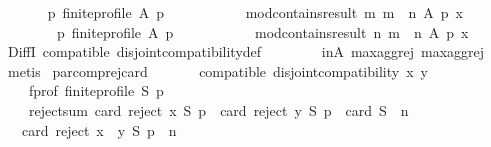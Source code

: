 \begin{isabellebody}
\ \ \isanewline
\ \ \ \ {\isachardoublequoteopen}{\isacharparenleft}{\kern0pt}{\isasymforall}p{\isachardot}{\kern0pt}\ finite{\isacharunderscore}{\kern0pt}profile\ A\ p\ {\isasymlongrightarrow}\isanewline
\ \ \ \ \ \ \ \ \ \ mod{\isacharunderscore}{\kern0pt}contains{\isacharunderscore}{\kern0pt}result\ m\ {\isacharparenleft}{\kern0pt}m\ {\isasymparallel}\isactrlsub {\isasymup}\ n{\isacharparenright}{\kern0pt}\ A\ p\ x{\isacharparenright}{\kern0pt}\ {\isasymor}\isanewline
\ \ \ \ \ \ \ \ {\isacharparenleft}{\kern0pt}{\isasymforall}p{\isachardot}{\kern0pt}\ finite{\isacharunderscore}{\kern0pt}profile\ A\ p\ {\isasymlongrightarrow}\isanewline
\ \ \ \ \ \ \ \ \ \ mod{\isacharunderscore}{\kern0pt}contains{\isacharunderscore}{\kern0pt}result\ n\ {\isacharparenleft}{\kern0pt}m\ {\isasymparallel}\isactrlsub {\isasymup}\ n{\isacharparenright}{\kern0pt}\ A\ p\ x{\isacharparenright}{\kern0pt}{\isachardoublequoteclose}\isanewline
%
\isadelimproof
\ \ %
\endisadelimproof
%
\isatagproof
{}\isamarkupfalse%
\ DiffI\ compatible\ disjoint{\isacharunderscore}{\kern0pt}compatibility{\isacharunderscore}{\kern0pt}def\isanewline
\ \ \ \ \ \ \ \ in{\isacharunderscore}{\kern0pt}A\ max{\isacharunderscore}{\kern0pt}agg{\isacharunderscore}{\kern0pt}rej{}\ max{\isacharunderscore}{\kern0pt}agg{\isacharunderscore}{\kern0pt}rej{}\isanewline
\ \ \isamarkupfalse%
\ metis%
\endisatagproof
{\isafoldproof}%
%
\isadelimproof
\isanewline
%
\endisadelimproof
\isanewline
{}\isamarkupfalse%
\ par{\isacharunderscore}{\kern0pt}comp{\isacharunderscore}{\kern0pt}rej{\isacharunderscore}{\kern0pt}card{\isacharcolon}{\kern0pt}\isanewline
\ \ \isanewline
\ \ \ \ compatible{\isacharcolon}{\kern0pt}\ {\isachardoublequoteopen}disjoint{\isacharunderscore}{\kern0pt}compatibility\ x\ y{\isachardoublequoteclose}\ \isanewline
\ \ \ \ f{\isacharunderscore}{\kern0pt}prof{\isacharcolon}{\kern0pt}\ {\isachardoublequoteopen}finite{\isacharunderscore}{\kern0pt}profile\ S\ p{\isachardoublequoteclose}\ \isanewline
\ \ \ \ reject{\isacharunderscore}{\kern0pt}sum{\isacharcolon}{\kern0pt}\ {\isachardoublequoteopen}card\ {\isacharparenleft}{\kern0pt}reject\ x\ S\ p{\isacharparenright}{\kern0pt}\ {\isacharplus}{\kern0pt}\ card\ {\isacharparenleft}{\kern0pt}reject\ y\ S\ p{\isacharparenright}{\kern0pt}\ {\isacharequal}{\kern0pt}\ card\ S\ {\isacharplus}{\kern0pt}\ n{\isachardoublequoteclose}\isanewline
\ \ \ {\isachardoublequoteopen}card\ {\isacharparenleft}{\kern0pt}reject\ {\isacharparenleft}{\kern0pt}x\ {\isasymparallel}\isactrlsub {\isasymup}\ y{\isacharparenright}{\kern0pt}\ S\ p{\isacharparenright}{\kern0pt}\ {\isacharequal}{\kern0pt}\ n{\isachardoublequoteclose}\isanewline

\end{isabellebody}
